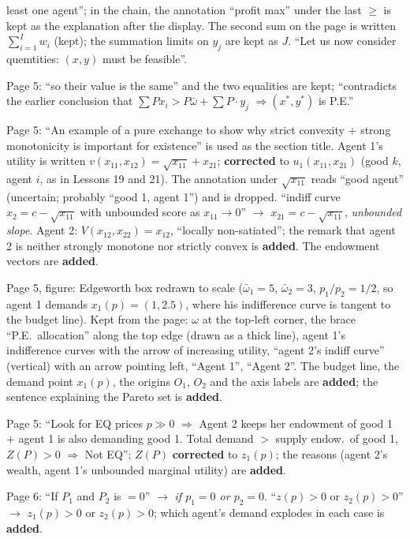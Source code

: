 \documentclass[11pt]{article}
\begin{document}
\begin{transcriptnotes}
        least one agent''; in the chain, the annotation ``profit max'' under the last
        $\ge$ is kept as the explanation after the display. The second sum on the page is
        written $\sum_{i=1}^{I}w_i$ (kept); the summation limits on $y_j$ are kept as $J$.
        ``Let us now consider quemtities: $(x,y)$ must be feasible''.
  \item Page 5: ``so their value is the same'' and the two equalities are kept; ``contradicts
        the earlier conclusion that $\sum Px_i>P\bar\omega+\sum P\cdot y_j$
        $\Rightarrow(x^*,y^*)$ is P.E.''
  \item Page 5: ``An example of a pure exchange to show why strict convexity $+$ strong
        monotonicity is important for existence'' is used as the section title. Agent 1's
        utility is written $v(x_{11},x_{12})=\sqrt{x_{11}}+x_{21}$; \textbf{corrected} to
        $u_1(x_{11},x_{21})$ (good $k$, agent $i$, as in Lessons 19 and 21). The annotation
        under $\sqrt{x_{11}}$ reads ``good agent'' (uncertain; probably ``good 1, agent 1'')
        and is dropped. ``indiff curve $x_2=c-\sqrt{x_{11}}$ with unbounded score as
        $x_{11}\to0$'' $\to$ $x_{21}=c-\sqrt{x_{11}}$, \emph{unbounded slope}. Agent 2:
        $V(x_{12},x_{22})=x_{12}$, ``locally non-satiated''; the remark that agent 2 is
        neither strongly monotone nor strictly convex is \textbf{added}. The endowment
        vectors are \textbf{added}.
  \item Page 5, figure: Edgeworth box redrawn to scale ($\bar\omega_1=5$, $\bar\omega_2=3$,
        $p_1/p_2=1/2$, so agent 1 demands $x_1(p)=(1,2.5)$, where his indifference curve
        is tangent to the budget line). Kept from the page: $\omega$
        at the top-left corner, the brace ``P.E.\ allocation'' along the top edge (drawn as
        a thick line), agent 1's indifference curves with the arrow of increasing utility,
        ``agent 2's indiff curve'' (vertical) with an arrow pointing left, ``Agent 1'',
        ``Agent 2''. The budget line, the demand point $x_1(p)$, the origins $O_1$, $O_2$
        and the axis labels are \textbf{added}; the sentence explaining the Pareto set is
        \textbf{added}.
  \item Page 5: ``Look for EQ prices $p\gg0$ $\Rightarrow$ Agent 2 keeps her endowment of
        good 1 $+$ agent 1 is also demanding good 1. Total demand $>$ supply endow.\ of good
        1, $Z(P)>0$ $\Rightarrow$ Not EQ''; $Z(P)$ \textbf{corrected} to $z_1(p)$; the
        reasons (agent 2's wealth, agent 1's unbounded marginal utility) are \textbf{added}.
  \item Page 6: ``If $P_1$ and $P_2$ is $=0$'' $\to$ \emph{if $p_1=0$ or $p_2=0$}.
        ``$z(p)>0$ or $z_2(p)>0$'' $\to$ $z_1(p)>0$ or $z_2(p)>0$; which agent's demand
        explodes in each case is \textbf{added}.
\end{transcriptnotes}
\end{document}
